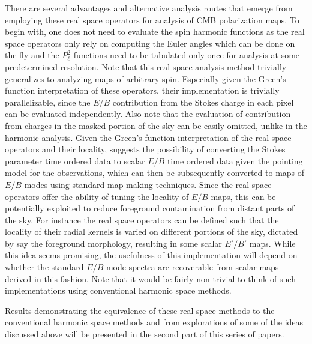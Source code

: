 There are several advantages and alternative analysis routes that emerge from employing these real space operators for analysis of CMB polarization maps. To begin with, one does not need to evaluate the spin harmonic functions as the real space operators only rely on computing the Euler angles which can be done on the fly and the $P_{\ell}^{2}$ functions need to be tabulated only once for analysis at some predetermined resolution. Note that this real space analysis method trivially generalizes to analyzing maps of arbitrary spin. Especially given the Green's function interpretation of these operators, their implementation is trivially parallelizable, since the $E/B$ contribution from the Stokes charge in each pixel can be evaluated independently. Also note that the evaluation of contribution from charges in the masked portion of the sky can be easily omitted, unlike in the harmonic analysis. Given the Green's function interpretation of the  real space operators and their locality, suggests the possibility of converting the Stokes parameter time ordered data to scalar $E/B$ time ordered data given the pointing model for the observations, which can then be subsequently converted to maps of $E/B$ modes using standard map making techniques. Since the real space operators offer the ability of tuning the locality of $E/B$ maps, this can be potentially exploited to reduce foreground contamination from distant parts of the sky. For instance the real space operators can be defined such that the locality of their radial kernels is varied on different portions of the sky, dictated by say the foreground morphology, resulting in some scalar $E'/B'$ maps.  While this idea seems promising, the usefulness of this implementation will depend on whether the standard $E/B$ mode spectra are recoverable from scalar maps derived in this fashion. Note that it would be fairly non-trivial to think of such implementations using conventional harmonic space methods.  

Results demonstrating the equivalence of these real space methods to the conventional harmonic space methods and from explorations of some of the ideas discussed above will be presented in the second part of this series of papers. 

